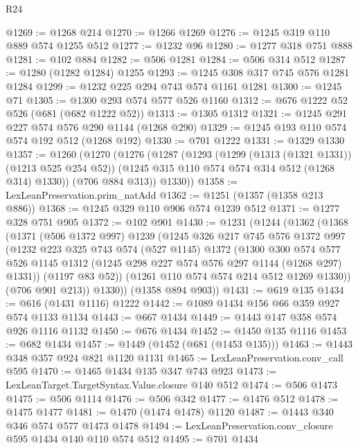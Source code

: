\begin{lexlean}{R24}
\begin{coremodule}
@1269 := @1268 @214
@1270 := @1266 @1269
@1276 := @1245 @319 @110 @889 @574 @1255 @512
@1277 := @1232 @96
@1280 := @1277 @318 @751 @888
@1281 := @102 @884
@1282 := @506 @1281
@1284 := @506 @314 @512
@1287 := @1280 (@1282 @1284) @1255
@1293 := @1245 @308 @317 @745 @576 @1281 @1284
@1299 := @1232 @225 @294 @743 @574 @1161 @1281
@1300 := @1245 @71
@1305 := @1300 @293 @574 @577 @526 @1160
@1312 := @676 @1222 @52 @526 (@681 (@682 @1222 @52))
@1313 := @1305 @1312
@1321 := @1245 @291 @227 @574 @576 @290 @1144 (@1268 @290)
@1329 := @1245 @193 @110 @574 @574 @192 @512 (@1268 @192)
@1330 := @701 @1222
@1331 := @1329 @1330
@1357 := @1260
    (@1270
      (@1276
        (@1287
          (@1293
            (@1299 (@1313 (@1321 @1331)) (@1213 @525 @254 @52))
            (@1245 @315 @110 @574 @574 @314 @512 (@1268 @314) @1330))
          (@706 @884 @313))
        @1330))
@1358 := LexLeanPreservation.prim_natAdd
@1362 := @1251 (@1357 (@1358 @213 @886))
@1368 := @1245 @329 @110 @906 @574 @1239 @512
@1371 := @1277 @328 @751 @905
@1372 := @102 @901
@1430 := @1231
    (@1244
      (@1362
        (@1368
          (@1371
            (@506 @1372 @997)
            @1239
            (@1245
              @326
              @217
              @745
              @576
              @1372
              @997
              (@1232
                @223
                @325
                @743
                @574
                (@527 @1145)
                @1372
                (@1300
                  @300
                  @574
                  @577
                  @526
                  @1145
                  @1312
                  (@1245 @298 @227 @574 @576 @297 @1144 (@1268 @297) @1331))
                (@1197 @83 @52))
              (@1261 @110 @574 @574 @214 @512 @1269 @1330))
            (@706 @901 @213))
          @1330))
      (@1358 @894 @903))
@1431 := @619 @135
@1434 := @616 (@1431 @1116) @1222
@1442 := @1089 @1434 @156 @66 @359 @927 @574 @1133 @1134
@1443 := @667 @1434
@1449 := @1443 @147 @358 @574 @926 @1116 @1132
@1450 := @676 @1434
@1452 := @1450 @135 @1116
@1453 := @682 @1434
@1457 := @1449 (@1452 (@681 (@1453 @135)))
@1463 := @1443 @348 @357 @924 @821 @1120 @1131
@1465 := LexLeanPreservation.conv_call @595
@1470 := @1465 @1434 @135 @347 @743 @923
@1473 := LexLeanTarget.TargetSyntax.Value.closure @140 @512
@1474 := @506 @1473
@1475 := @506 @1114
@1476 := @506 @342
@1477 := @1476 @512
@1478 := @1475 @1477
@1481 := @1470 (@1474 @1478) @1120
@1487 := @1443 @340 @346 @574 @577 @1473 @1478
@1494 := LexLeanPreservation.conv_closure @595 @1434 @140 @110 @574 @512
@1495 := @701 @1434

\end{coremodule}
\end{lexlean}
